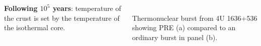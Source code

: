 \begin{frame}
\begin{columns}[c]
\begin{column}{0.65\textwidth}
\begin{enumerate}
{	   \item {\bf Following $10^5$ years}: temperature of the crust is set by the temperature of the isothermal core.
	   }
\end{enumerate}	
\end{column}
\begin{column}{0.4\textwidth}    
 \\
 {\tiny Thermonuclear burst from 4U 1636+536 showing PRE (a) compared to an ordinary burst in panel (b). }
\end{column}
\end{columns}
\end{frame}






